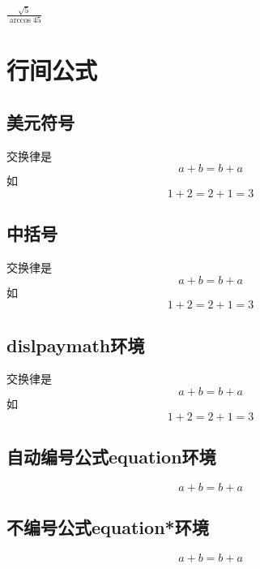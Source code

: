 \documentclass{ctexart}
\begin{document}
        $\frac{\sqrt{5}}{\arccos{45}}$
        \section{行间公式}
            \subsection{美元符号}
            交换律是
            $$a+b=b+a$$
            如$$1+2=2+1=3$$
            \subsection{中括号}
            交换律是
            \[a+b=b+a\]
            如\[1+2=2+1=3\]
            \subsection{dislpaymath环境}
            交换律是
            \begin{displaymath}
            a+b=b+a
            \end{displaymath}
            如
            \begin{displaymath}
                1+2=2+1=3
            \end{displaymath}
            \subsection{自动编号公式equation环境}
                \begin{equation}
                    a+b = b+a
                \end{equation}
            \subsection{不编号公式equation*环境}
                \begin{equation*}
                    a+b = b+a    
                \end{equation*}    
\end{document}
